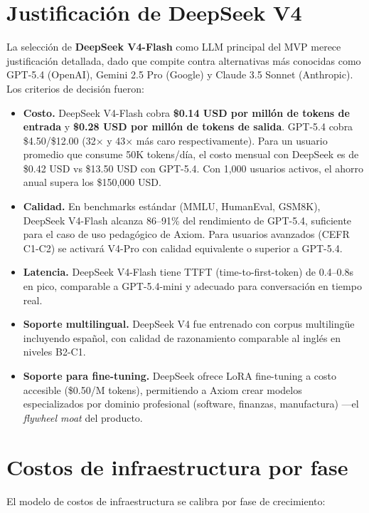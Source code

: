 \documentclass[10pt,a4paper,oneside]{report}
\begin{document}
\section{Justificación de DeepSeek V4}
La selección de \textbf{DeepSeek V4-Flash} como LLM principal del MVP merece justificación detallada, dado que compite contra alternativas más conocidas como GPT-5.4 (OpenAI), Gemini 2.5 Pro (Google) y Claude 3.5 Sonnet (Anthropic). Los criterios de decisión fueron:

\begin{itemize}[leftmargin=1.4em]
\item \textbf{Costo.} DeepSeek V4-Flash cobra \textbf{\$0.14 USD por millón de tokens de entrada} y \textbf{\$0.28 USD por millón de tokens de salida}. GPT-5.4 cobra \$4.50/\$12.00 (32× y 43× más caro respectivamente). Para un usuario promedio que consume 50K tokens/día, el costo mensual con DeepSeek es de \$0.42 USD vs \$13.50 USD con GPT-5.4. Con 1,000 usuarios activos, el ahorro anual supera los \$150,000 USD.
\item \textbf{Calidad.} En benchmarks estándar (MMLU, HumanEval, GSM8K), DeepSeek V4-Flash alcanza 86--91\% del rendimiento de GPT-5.4, suficiente para el caso de uso pedagógico de Axiom. Para usuarios avanzados (CEFR C1-C2) se activará V4-Pro con calidad equivalente o superior a GPT-5.4.
\item \textbf{Latencia.} DeepSeek V4-Flash tiene TTFT (time-to-first-token) de 0.4--0.8s en pico, comparable a GPT-5.4-mini y adecuado para conversación en tiempo real.
\item \textbf{Soporte multilingual.} DeepSeek V4 fue entrenado con corpus multilingüe incluyendo español, con calidad de razonamiento comparable al inglés en niveles B2-C1.
\item \textbf{Soporte para fine-tuning.} DeepSeek ofrece LoRA fine-tuning a costo accesible (\$0.50/M tokens), permitiendo a Axiom crear modelos especializados por dominio profesional (software, finanzas, manufactura) —el \textit{flywheel moat} del producto.
\end{itemize}

\section{Costos de infraestructura por fase}
El modelo de costos de infraestructura se calibra por fase de crecimiento:
\end{document}
